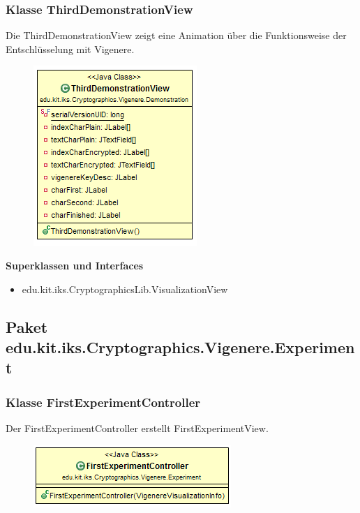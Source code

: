 \documentclass{article}
\begin{document}
    \subsubsection{Klasse ThirdDemonstrationView}
      Die ThirdDemonstrationView zeigt eine Animation über die Funktionsweise der Entschlüsselung mit Vigenere.
      \begin{figure}[H]
        \centering
        \includegraphics{resources/edu-kit-iks-Cryptographics-Vigenere-ThirdDemonstrationView}
      \end{figure}

      \textbf{Superklassen und Interfaces}
      \begin{itemize}
        \item edu.kit.iks.CryptographicsLib.VisualizationView
      \end{itemize}

  \subsection{Paket edu.kit.iks.Cryptographics.Vigenere.Experiment}
    \subsubsection{Klasse FirstExperimentController}
      Der FirstExperimentController erstellt FirstExperimentView.
      \begin{figure}[H]
        \centering
        \includegraphics{resources/edu-kit-iks-Cryptographics-Vigenere-FirstExperimentController}
      \end{figure}
\end{document}

